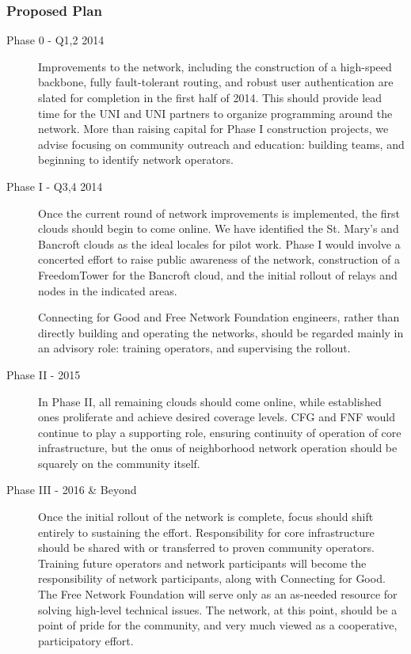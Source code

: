 \subsubsection{Proposed Plan}
\begin{description}
\item[Phase 0 - Q1,2 2014] Improvements to the network, including the construction of a high-speed backbone,
fully fault-tolerant routing, and robust user authentication are slated for completion in the first half of
2014. This should provide lead time for the UNI and UNI partners to organize programming around the network.
More than raising capital for Phase I construction projects, we advise focusing on community outreach and
education: building teams, and beginning to identify network operators.
\item[Phase I - Q3,4 2014] Once the current round of network improvements is implemented, the first clouds
should begin to come online. We have identified the St. Mary's and Bancroft clouds as the ideal
locales for pilot work. Phase I would involve a concerted effort to raise public awareness of the network,
construction of a FreedomTower for the Bancroft cloud, and the initial rollout of relays and nodes in the indicated
areas. \par
Connecting for Good and Free Network Foundation engineers, rather than directly building and operating the networks,
should be regarded mainly in an advisory role: training operators, and supervising the rollout.
\item[Phase II - 2015]  In Phase II, all remaining clouds should come online, while established ones proliferate and
achieve desired coverage levels. CFG and FNF would continue to play a supporting role, ensuring continuity of
operation of core infrastructure, but the onus of neighborhood network operation should be squarely on the community
itself.
\item[Phase III - 2016 \& Beyond] Once the initial rollout of the network is complete, focus should shift entirely
to sustaining the effort. Responsibility for core infrastructure should be shared with or transferred to proven community
operators. Training future operators and network participants will become the responsibility of network participants, along
with Connecting for Good. The Free Network Foundation will serve only as an as-needed resource for solving high-level
technical issues. The network, at this point, should be a point of pride for the community, and very much viewed as
a cooperative, participatory effort.
\end{description}

